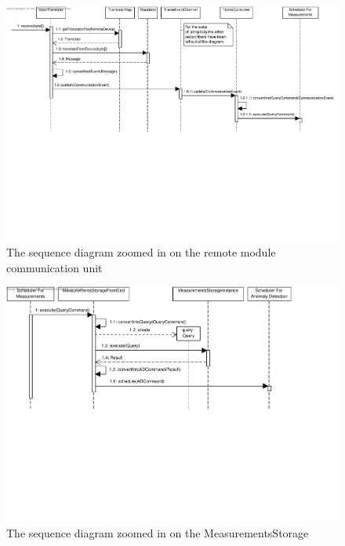 \begin{figure}[H]
	\begin{centering}
		\includegraphics[width=\textwidth]{figs/scenario-5-6a.pdf}
		\caption{The sequence diagram zoomed in on the remote module communication
		unit}
		\label{fig:scenario-5-6a}
	\end{centering}
\end{figure}

\begin{figure}[H]
	\begin{centering}
		\includegraphics[width=\textwidth]{figs/scenario-5-6b.pdf}
		\caption{The sequence diagram zoomed in on the MeasurementsStorage}
		\label{fig:scenario-5-6b}
	\end{centering}
\end{figure}

